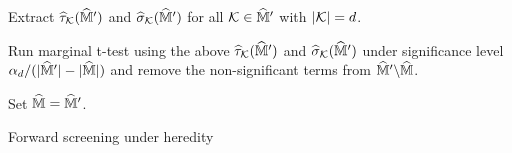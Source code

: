 \documentclass[12pt]{article}
\begin{document}
\begin{algorithm}[!htbp]
{      %
      Extract $\widehat{\tau}_{{\mathcal{K}}}(\widehat{{\mathbb{M}}}')$ and $\widehat{\sigma}_{\mathcal{K}}(\widehat{{\mathbb{M}}}')$ for all ${\mathcal{K}}\in\widehat{{\mathbb{M}}}'$ with $|{\mathcal{K}}| = d$.

      Run marginal t-test using the above $\widehat{\tau}_{{\mathcal{K}}}(\widehat{{\mathbb{M}}}')$ and $\widehat{\sigma}_{\mathcal{K}}(\widehat{{\mathbb{M}}}')$  under significance level $\alpha_d/(|\widehat{{\mathbb{M}}}'|-|\widehat{{\mathbb{M}}}|)$ and remove the non-significant terms from $\widehat{{\mathbb{M}}}'\backslash\widehat{{\mathbb{M}}}$.

      Set $\widehat{{\mathbb{M}}} = \widehat{{\mathbb{M}}}'$.
         
    }
    
    
    \KwRet{$\hat{\bbM}$}
    
\caption{Forward  screening under heredity}
\label{alg:forward-ms-appendix}
\end{algorithm}
\end{document}
